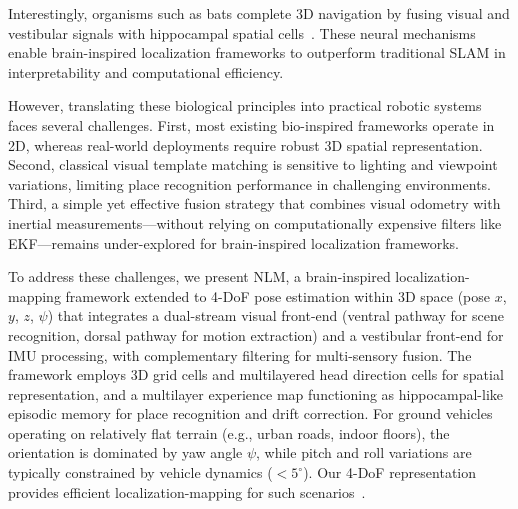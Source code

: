 \documentclass[twocolumn,journal]{IEEEtran}
\begin{document}
Interestingly, organisms such as bats complete 3D navigation by fusing visual and vestibular signals with hippocampal spatial cells~\cite{jeffery2013navigating,hafting2005microstructure,taube1990head,finkelstein2016three,solstad2008representation}. These neural mechanisms enable brain-inspired localization frameworks to outperform traditional SLAM in interpretability and computational efficiency.

However, translating these biological principles into practical robotic systems faces several challenges. First, most existing bio-inspired frameworks operate in 2D, whereas real-world deployments require robust 3D spatial representation. Second, classical visual template matching is sensitive to lighting and viewpoint variations, limiting place recognition performance in challenging environments. Third, a simple yet effective fusion strategy that combines visual odometry with inertial measurements---without relying on computationally expensive filters like EKF---remains under-explored for brain-inspired localization frameworks.

To address these challenges, we present NLM, a brain-inspired localization-mapping framework extended to 4-DoF pose estimation within 3D space (pose $x$, $y$, $z$, $\psi$) that integrates a dual-stream visual front-end (ventral pathway for scene recognition, dorsal pathway for motion extraction) and a vestibular front-end for IMU processing, with complementary filtering for multi-sensory fusion. The framework employs 3D grid cells and multilayered head direction cells for spatial representation, and a multilayer experience map functioning as hippocampal-like episodic memory for place recognition and drift correction. For ground vehicles operating on relatively flat terrain (e.g., urban roads, indoor floors), the orientation is dominated by yaw angle $\psi$, while pitch and roll variations are typically constrained by vehicle dynamics ($<5^\circ$). Our 4-DoF representation provides efficient localization-mapping for such scenarios~\cite{milford2004ratslam,milford2010persistent}.
\end{document}
